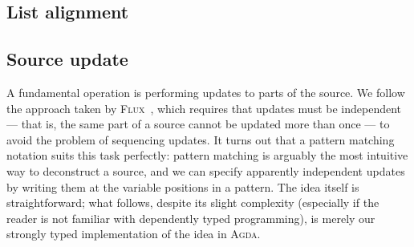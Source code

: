\documentclass[fleqn]{llncs}
\newcommand{\Agda}{\textsc{Agda}}
\begin{document}
\subsection{List alignment}
\label{sec:list-alignment}

\subsection{Source update}
\label{sec:source-update}

A fundamental operation is performing updates to parts of the source.
We follow the approach taken by \textsc{Flux}~\cite{Cheney-FLUX}, which requires that updates must be independent --- that is, the same part of a source cannot be updated more than once --- to avoid the problem of sequencing updates.
It turns out that a pattern matching notation suits this task perfectly: pattern matching is arguably the most intuitive way to deconstruct a source, and we can specify apparently independent updates by writing them at the variable positions in a pattern.
The idea itself is straightforward; what follows, despite its slight complexity (especially if the reader is not familiar with dependently typed programming), is merely our strongly typed implementation of the idea in \Agda.
\end{document}
